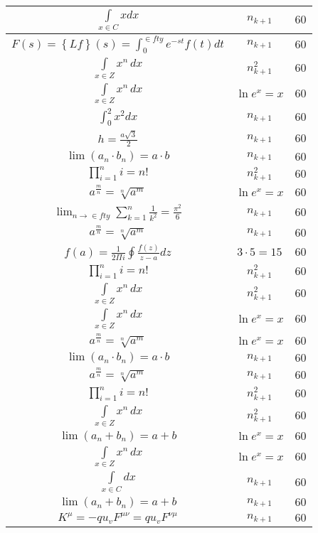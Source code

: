 \documentclass{article}
\begin{document}
\begin{flushleft}
\begin{longtable}{|c|c|c|}
$\int \limits_{x\in C}xdx$ & $n_{k+1}$ & $60$ \\ \hline 
$F\left(s\right)=\left\{Lf\right\}\left(s\right)=\int _{0}^{\in fty}e^{-st}f\left(t\right)dt$ & $n_{k+1}$ & $60$ \\ \hline 
$\int \limits_{x\in Z}\!x^{n}\,dx$ & $n_{k+1}^2$ & $60$ \\ \hline 
$\int \limits_{x\in Z}\!x^{n}\,dx$ & $\ln e^x=x$ & $60$ \\ \hline 
$\int _0^2x^2dx$ & $n_{k+1}$ & $60$ \\ \hline 
$h=\frac{a\sqrt{3}}{2}$ & $n_{k+1}$ & $60$ \\ \hline 
$\lim\left(a_n\cdot b_n\right)=a\cdot b$ & $n_{k+1}$ & $60$ \\ \hline 
$\prod_{i=1}^ni=n!$ & $n_{k+1}^2$ & $60$ \\ \hline 
$a^{\frac{m}{n}}=\sqrt[n]{a^{m}}$ & $\ln e^x=x$ & $60$ \\ \hline 
$\lim_{n\to\in fty}\sum_{k=1}^n\frac{1}{k^2}=\frac{\pi^2}{6}$ & $n_{k+1}$ & $60$ \\ \hline 
$a^{\frac{m}{n}}=\sqrt[n]{a^{m}}$ & $n_{k+1}$ & $60$ \\ \hline 
$f\left(a\right)=\frac{1}{2\Pi i}\oint\frac{f\left(z\right)}{z-a}dz$ & $3\cdot 5=15$ & $60$ \\ \hline 
$\prod_{i=1}^ni=n!$ & $n_{k+1}^2$ & $60$ \\ \hline 
$\int \limits_{x\in Z}\!x^{n}\,dx$ & $n_{k+1}^2$ & $60$ \\ \hline 
$\int \limits_{x\in Z}\!x^{n}\,dx$ & $\ln e^x=x$ & $60$ \\ \hline 
$a^{\frac{m}{n}}=\sqrt[n]{a^{m}}$ & $\ln e^x=x$ & $60$ \\ \hline 
$\lim\left(a_n\cdot b_n\right)=a\cdot b$ & $n_{k+1}$ & $60$ \\ \hline 
$a^{\frac{m}{n}}=\sqrt[n]{a^{m}}$ & $n_{k+1}$ & $60$ \\ \hline 
$\prod_{i=1}^ni=n!$ & $n_{k+1}^2$ & $60$ \\ \hline 
$\int \limits_{x\in Z}\!x^{n}\,dx$ & $n_{k+1}^2$ & $60$ \\ \hline 
$\lim\left(a_n+b_n\right)=a+b$ & $\ln e^x=x$ & $60$ \\ \hline 
$\int \limits_{x\in Z}\!x^{n}\,dx$ & $\ln e^x=x$ & $60$ \\ \hline 
$\int \limits_{x\in C}dx$ & $n_{k+1}$ & $60$ \\ \hline 
$\lim\left(a_n+b_n\right)=a+b$ & $n_{k+1}$ & $60$ \\ \hline 
$K^\mu=-qu_vF^{\mu\nu}=qu_vF^{\nu\mu}$ & $n_{k+1}$ & $60$ \\ \hline 

\end{longtable}
\end{flushleft}
\end{document}
